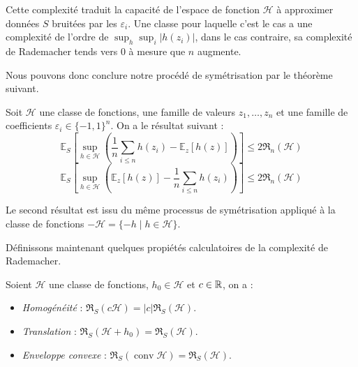 Cette complexité traduit la capacité de l'espace de fonction $ \mathcal{H}$ à approximer données $S$ bruitées par les $ \varepsilon_i$. Une classe pour laquelle c'est le cas a une complexité de l'ordre de $ \sup_h \sup_i \left| h(z_i)\right|$, dans le cas contraire, sa complexité de Rademacher tends vers $0$ à mesure que $n$ augmente. 

Nous pouvons donc conclure notre procédé de symétrisation par le théorème suivant. 

\begin{theorem}[Symétrisation]
    Soit $ \mathcal{H}$ une classe de fonctions, une famille de valeurs $ z_1, \dots, z_n$ et une famille de coefficients $ \varepsilon_i \in \{-1, 1\}^n$. On a le résultat suivant : 
    \begin{equation}
        \mathbb{E}_S \left[ \underset{h \in \mathcal{H}}{\sup} \left( \frac{1}{n} \sum_{i \leqslant n} h(z_i) - \mathbb{E}_z [h(z)]\right)\right] \leqslant 2 \mathfrak{R}_n( \mathcal{H})
    \end{equation}
    \begin{equation}
        \mathbb{E}_S \left[ \underset{h \in \mathcal{H}}{\sup} \left( \mathbb{E}_z [h(z)] - \frac{1}{n} \sum_{i \leqslant n} h(z_i)\right)\right] \leqslant 2 \mathfrak{R}_n( \mathcal{H})
    \end{equation}
\end{theorem}

\begin{remark}
    Le second résultat est issu du même processus de symétrisation appliqué à la classe de fonctions $ - \mathcal{H} = \{-h \mid h \in \mathcal{H}\}$. 
\end{remark}

Définissons maintenant quelques propiétés calculatoires de la complexité de Rademacher. 

\begin{prop}
    Soient $ \mathcal{H}$ une classe de fonctions, $ h_0 \in \mathcal{H}$ et $c \in \mathbb{R}$, on a : 
    \begin{itemize}
        \item \emph{Homogénéité} : $ \mathfrak{R}_S(c \mathcal{H}) = |c| \mathfrak{R}_S(\mathcal{H})$. 
        \item \emph{Translation} :  $ \mathfrak{R}_S(\mathcal{H} + h_0) = \mathfrak{R}_S(\mathcal{H})$. 
        \item \emph{Enveloppe convexe} : $ \mathfrak{R}_S(\operatorname{conv} \mathcal{H}) = \mathfrak{R}_S(\mathcal{H})$. 
    \end{itemize}
\end{prop}

